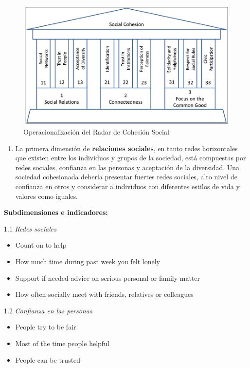 \documentclass[
  12pt,
]{book}
\providecommand{\tightlist}{%
  \setlength{\itemsep}{0pt}\setlength{\parskip}{0pt}}
\begin{document}
\begin{figure}[H]

{\centering \includegraphics[width=0.75\linewidth]{inputs/images/radar} 

}

\caption{Operacionalización del Radar de Cohesión Social}\label{fig:radar}
\end{figure}

\begin{enumerate}
\def\labelenumi{\arabic{enumi}.}
\tightlist
\item
  La primera dimensión de \textbf{relaciones sociales}, en tanto redes horizontales que existen entre los individuos y grupos de la sociedad, está compuestas por redes sociales, confianza en las personas y aceptación de la diversidad. Una sociedad cohesionada debería presentar fuertes redes sociales, alto nivel de confianza en otros y considerar a individuos con diferentes estilos de vida y valores como iguales.
\end{enumerate}

\textbf{Subdimensiones e indicadores:}

1.1 \emph{Redes sociales}

\begin{itemize}
\tightlist
\item
  Count on to help
\item
  How much time during past week you felt lonely
\item
  Support if needed advice on serious personal or family matter
\item
  How often socially meet with friends, relatives or colleagues
\end{itemize}

1.2 \emph{Confianza en las personas}

\begin{itemize}
\tightlist
\item
  People try to be fair
\item
  Most of the time people helpful
\item
  People can be trusted
\end{itemize}
\end{document}
